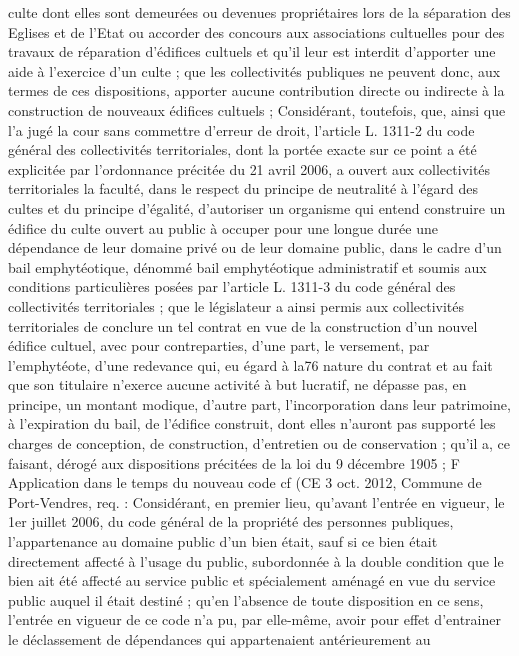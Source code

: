 \documentclass[11pt,a4paper]{report}
\begin{document}
culte dont elles sont demeurées ou devenues propriétaires lors de la séparation des Eglises et de l'Etat ou accorder
des concours aux associations cultuelles pour des travaux de réparation d'édifices cultuels et qu'il leur est interdit
d'apporter une aide à l'exercice d'un culte ; que les collectivités publiques ne peuvent donc, aux termes de ces
dispositions, apporter aucune contribution directe ou indirecte à la construction de nouveaux édifices cultuels ;
Considérant, toutefois, que, ainsi que l'a jugé la cour sans commettre d'erreur de droit, l'article L. 1311-2 du code
général des collectivités territoriales, dont la portée exacte sur ce point a été explicitée par l'ordonnance précitée
du 21 avril 2006, a ouvert aux collectivités territoriales la faculté, dans le respect du principe de neutralité à
l'égard des cultes et du principe d'égalité, d'autoriser un organisme qui entend construire un édifice du culte ouvert
au public à occuper pour une longue durée une dépendance de leur domaine privé ou de leur domaine public,
dans le cadre d'un bail emphytéotique, dénommé bail emphytéotique administratif et soumis aux conditions
particulières posées par l'article L. 1311-3 du code général des collectivités territoriales ; que le législateur a
ainsi permis aux collectivités territoriales de conclure un tel contrat en vue de la construction d'un nouvel édifice
cultuel, avec pour contreparties, d'une part, le versement, par l'emphytéote, d'une redevance qui, eu égard à la76
nature du contrat et au fait que son titulaire n'exerce aucune activité à but lucratif, ne dépasse pas, en principe,
un montant modique, d'autre part, l'incorporation dans leur patrimoine, à l'expiration du bail, de l'édifice
construit, dont elles n'auront pas supporté les charges de conception, de construction, d'entretien ou de
conservation ; qu'il a, ce faisant, dérogé aux dispositions précitées de la loi du 9 décembre 1905 ;
F Application dans le temps du nouveau code
cf (CE 3 oct. 2012, Commune de Port-Vendres, req.  : Considérant, en premier lieu, qu'avant l'entrée
en vigueur, le 1er juillet 2006, du code général de la propriété des personnes publiques, l'appartenance au
domaine public d'un bien était, sauf si ce bien était directement affecté à l'usage du public, subordonnée à la
double condition que le bien ait été affecté au service public et spécialement aménagé en vue du service public
auquel il était destiné ; qu'en l'absence de toute disposition en ce sens, l'entrée en vigueur de ce code n'a pu, par
elle-même, avoir pour effet d'entrainer le déclassement de dépendances qui appartenaient antérieurement au
\end{document}
